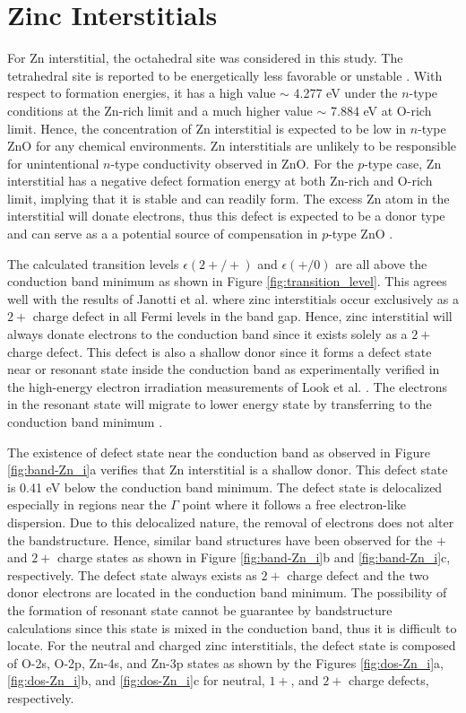 \section{Zinc Interstitials}

For Zn interstitial, the octahedral site was considered in this study. The tetrahedral site is reported to be energetically less favorable or unstable \citep{Oba2001,Zhao2006,Oba2010}. With respect to formation energies, it has a high value   $\sim$ 4.277 eV under the $n$-type conditions at the  Zn-rich limit and a much higher value  $\sim$ 7.884 eV at O-rich limit. Hence, the concentration of Zn interstitial is expected to be low in $n$-type ZnO for any chemical environments. Zn interstitials are unlikely to be responsible for unintentional $n$-type conductivity observed in ZnO. For the $p$-type case, Zn interstitial has a negative defect formation energy at both Zn-rich and O-rich limit, implying that it is stable and can readily form. The excess Zn atom in the interstitial will donate electrons, thus this defect is expected to be a donor type and can serve as a a potential source of compensation in $p$-type ZnO \citep{Janotti2007}.

The calculated transition levels $\epsilon(2+/+)$ and $\epsilon(+/0)$ are all above the conduction band minimum as shown in Figure \ref{fig:transition_level}. This agrees well with the results of Janotti et al. \citep{Janotti2007} where zinc interstitials occur exclusively as a $2+$ charge defect in all Fermi levels in the band gap. Hence, zinc interstitial will always donate electrons to the conduction band since it exists solely as a $2+$ charge defect. This defect is also a shallow donor since it forms a  defect state near or resonant state inside the conduction band as experimentally verified in the high-energy electron irradiation measurements of Look et al. \citep{Look1999}. The electrons in the resonant state will 	migrate to lower energy state by transferring to the conduction band minimum \citep{Freysoldt2014}.

The existence of defect state near the conduction band as observed in Figure \ref{fig:band-Zn_i}a verifies that Zn interstitial is a shallow donor. This defect state is 0.41 eV below the conduction band minimum.  The defect state is delocalized especially in regions near the $\Gamma$ point where it follows a free electron-like dispersion. Due to this delocalized nature, the  removal of electrons does not alter the bandstructure. Hence, similar band structures have been observed for the $+$ and $2+$ charge states as shown in Figure
\ref{fig:band-Zn_i}b and \ref{fig:band-Zn_i}c, respectively. The defect state always exists as $2+$ charge defect and the two donor electrons are located in the conduction band minimum. The possibility of the formation of resonant state cannot be guarantee by bandstructure calculations since this state is mixed in the conduction band, thus it is difficult to locate. For the neutral and charged zinc interstitials, the defect state is composed of O-2s, O-2p, Zn-4s, and Zn-3p states as shown by the Figures \ref{fig:dos-Zn_i}a, \ref{fig:dos-Zn_i}b, and \ref{fig:dos-Zn_i}c for neutral, $1+$, and $2+$ charge defects, respectively.

